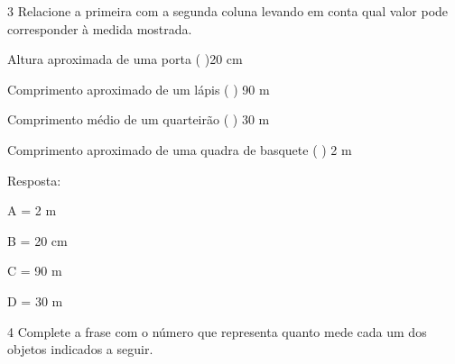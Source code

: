 \num{3} Relacione a primeira com a segunda coluna levando em conta qual valor
pode corresponder à medida mostrada.

\begin{escolha}

\item
  Altura aproximada de uma porta ( )20 cm
\item
  Comprimento aproximado de um lápis ( ) 90 m
\item
  Comprimento médio de um quarteirão ( ) 30 m
\item
  Comprimento aproximado de uma quadra de basquete ( ) 2 m

\end{escolha}

Resposta:

A = 2 m

B = 20 cm

C = 90 m

D = 30 m

\num{4} Complete a frase com o número que representa quanto mede cada um dos
objetos indicados a seguir.

